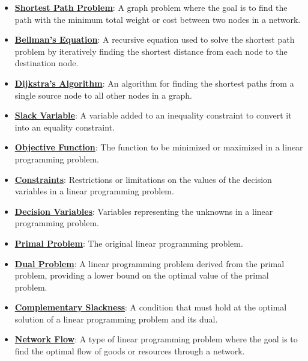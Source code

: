 \documentclass{article}%
\begin{document}
\begin{itemize}[leftmargin=*]
\item \href{https://www.math.purdue.edu/~yipn/421/2024-11-14-NetAppls.pdf#page=13}{\textbf{Shortest Path Problem}}: A graph problem where the goal is to find the path with the minimum total weight or cost between two nodes in a network.%
\item \href{https://www.math.purdue.edu/~yipn/421/2024-11-14-NetAppls.pdf#page=16}{\textbf{Bellman's Equation}}: A recursive equation used to solve the shortest path problem by iteratively finding the shortest distance from each node to the destination node.%
\item \href{https://www.math.purdue.edu/~yipn/421/2024-11-14-NetAppls.pdf#page=20}{\textbf{Dijkstra's Algorithm}}: An algorithm for finding the shortest paths from a single source node to all other nodes in a graph.%
\item \href{https://www.math.purdue.edu/~yipn/421/2024-11-14-NetAppls.pdf#page=2}{\textbf{Slack Variable}}: A variable added to an inequality constraint to convert it into an equality constraint.%
\item \href{https://www.math.purdue.edu/~yipn/421/2024-11-14-NetAppls.pdf#page=1}{\textbf{Objective Function}}: The function to be minimized or maximized in a linear programming problem.%
\item \href{https://www.math.purdue.edu/~yipn/421/2024-11-14-NetAppls.pdf#page=1}{\textbf{Constraints}}: Restrictions or limitations on the values of the decision variables in a linear programming problem.%
\item \href{https://www.math.purdue.edu/~yipn/421/2024-11-14-NetAppls.pdf#page=1}{\textbf{Decision Variables}}: Variables representing the unknowns in a linear programming problem.%
\item \href{https://www.math.purdue.edu/~yipn/421/2024-11-14-NetAppls.pdf#page=7}{\textbf{Primal Problem}}: The original linear programming problem.%
\item \href{https://www.math.purdue.edu/~yipn/421/2024-11-14-NetAppls.pdf#page=7}{\textbf{Dual Problem}}: A linear programming problem derived from the primal problem, providing a lower bound on the optimal value of the primal problem.%
\item \href{https://www.math.purdue.edu/~yipn/421/2024-11-14-NetAppls.pdf#page=7}{\textbf{Complementary Slackness}}: A condition that must hold at the optimal solution of a linear programming problem and its dual.%
\item \href{https://www.math.purdue.edu/~yipn/421/2024-11-14-NetAppls.pdf#page=1}{\textbf{Network Flow}}: A type of linear programming problem where the goal is to find the optimal flow of goods or resources through a network.%

\end{itemize}
\end{document}

